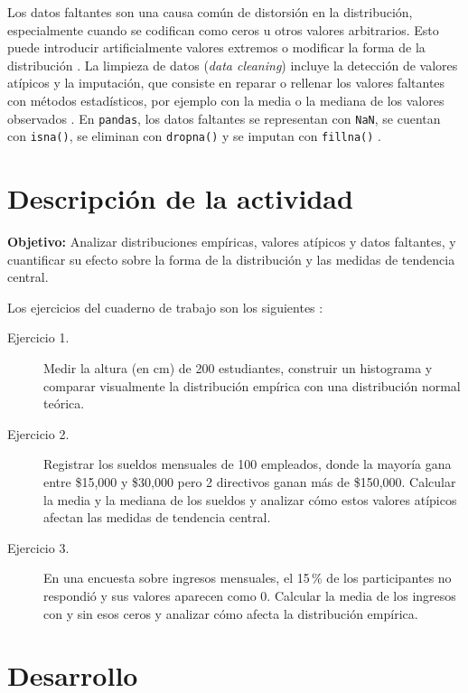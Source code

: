 \documentclass[11pt,letterpaper]{article}
\begin{document}
Los datos faltantes son una causa común de distorsión en la distribución, especialmente cuando se codifican como ceros u otros valores arbitrarios. Esto puede introducir artificialmente valores extremos o modificar la forma de la distribución \parencite{tecnm2026_documento_fuente,brownlee2019}. La limpieza de datos (\textit{data cleaning}) incluye la detección de valores atípicos y la imputación, que consiste en reparar o rellenar los valores faltantes con métodos estadísticos, por ejemplo con la media o la mediana de los valores observados \parencite{tecnm2026_documento_fuente,brownlee2019}. En \texttt{pandas}, los datos faltantes se representan con \texttt{NaN}, se cuentan con \texttt{isna()}, se eliminan con \texttt{dropna()} y se imputan con \texttt{fillna()} \parencite{tecnm2026_documento_fuente}.

\section{Descripción de la actividad}

\textbf{Objetivo:} Analizar distribuciones empíricas, valores atípicos y datos faltantes, y cuantificar su efecto sobre la forma de la distribución y las medidas de tendencia central.

Los ejercicios del cuaderno de trabajo son los siguientes \parencite{tecnm2026_documento_fuente}:

\begin{description}
    \item[Ejercicio 1.] Medir la altura (en cm) de 200 estudiantes, construir un histograma y comparar visualmente la distribución empírica con una distribución normal teórica.
    \item[Ejercicio 2.] Registrar los sueldos mensuales de 100 empleados, donde la mayoría gana entre \$15,000 y \$30,000 pero 2 directivos ganan más de \$150,000. Calcular la media y la mediana de los sueldos y analizar cómo estos valores atípicos afectan las medidas de tendencia central.
    \item[Ejercicio 3.] En una encuesta sobre ingresos mensuales, el 15\,\% de los participantes no respondió y sus valores aparecen como 0. Calcular la media de los ingresos con y sin esos ceros y analizar cómo afecta la distribución empírica.
\end{description}

\section{Desarrollo}
\end{document}

